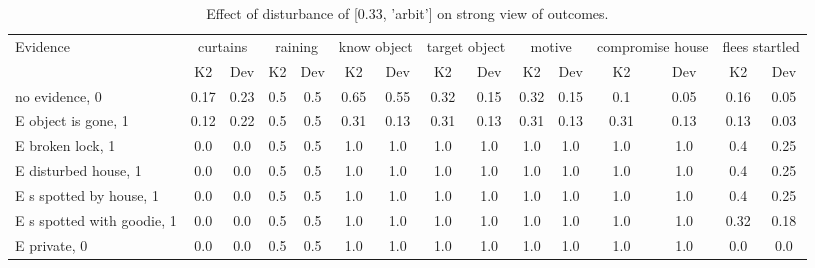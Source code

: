 \begin{table}\begin{tabular}{l|cc|cc|cc|cc|cc|cc|cc}\toprule\multirow{2}{*}{Evidence} & \multicolumn{2}{c}{curtains}& \multicolumn{2}{c}{raining}& \multicolumn{2}{c}{know object}& \multicolumn{2}{c}{target object}& \multicolumn{2}{c}{motive}& \multicolumn{2}{c}{compromise house}& \multicolumn{2}{c}{flees startled}\\& {K2} & {Dev}& {K2} & {Dev}& {K2} & {Dev}& {K2} & {Dev}& {K2} & {Dev}& {K2} & {Dev}& {K2} & {Dev}\\\midrule
no evidence, 0 & \cellcolor{Bittersweet}0.17&\cellcolor{Bittersweet}0.23&0.5&0.5&\cellcolor{Bittersweet}0.65&\cellcolor{Bittersweet}0.55&\cellcolor{Bittersweet}0.32&\cellcolor{Bittersweet}0.15&\cellcolor{Bittersweet}0.32&\cellcolor{Bittersweet}0.15&\cellcolor{Bittersweet}0.1&\cellcolor{Bittersweet}0.05&\cellcolor{Bittersweet}0.16&\cellcolor{Bittersweet}0.05\\E object is gone, 1 & \cellcolor{Bittersweet}0.12&\cellcolor{Bittersweet}0.22&0.5&0.5&\cellcolor{Bittersweet}0.31&\cellcolor{Bittersweet}0.13&\cellcolor{Bittersweet}0.31&\cellcolor{Bittersweet}0.13&\cellcolor{Bittersweet}0.31&\cellcolor{Bittersweet}0.13&\cellcolor{Bittersweet}0.31&\cellcolor{Bittersweet}0.13&\cellcolor{Bittersweet}0.13&\cellcolor{Bittersweet}0.03\\E broken lock, 1 & 0.0&0.0&0.5&0.5&1.0&1.0&1.0&1.0&1.0&1.0&1.0&1.0&\cellcolor{Bittersweet}0.4&\cellcolor{Bittersweet}0.25\\E disturbed house, 1 & 0.0&0.0&0.5&0.5&1.0&1.0&1.0&1.0&1.0&1.0&1.0&1.0&\cellcolor{Bittersweet}0.4&\cellcolor{Bittersweet}0.25\\E s spotted by house, 1 & 0.0&0.0&0.5&0.5&1.0&1.0&1.0&1.0&1.0&1.0&1.0&1.0&\cellcolor{Bittersweet}0.4&\cellcolor{Bittersweet}0.25\\E s spotted with goodie, 1 & 0.0&0.0&0.5&0.5&1.0&1.0&1.0&1.0&1.0&1.0&1.0&1.0&\cellcolor{Bittersweet}0.32&\cellcolor{Bittersweet}0.18\\E private, 0 & 0.0&0.0&0.5&0.5&1.0&1.0&1.0&1.0&1.0&1.0&1.0&1.0&0.0&0.0\\\bottomrule\end{tabular}\caption{Effect of disturbance of [0.33, 'arbit'] on strong view of outcomes.}\end{table}